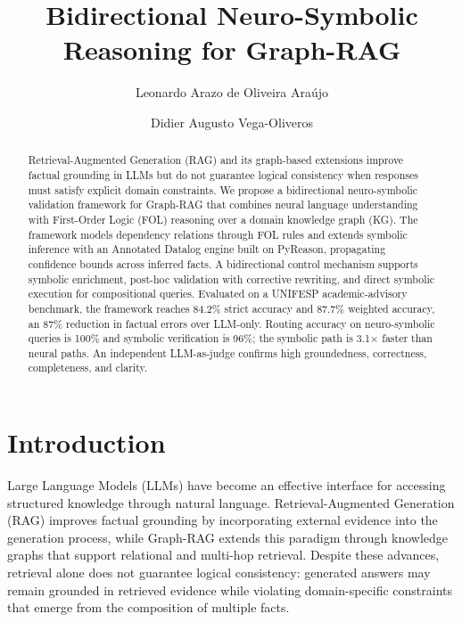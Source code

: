 \documentclass[runningheads]{llncs}
\begin{document}
%
\title{Bidirectional Neuro-Symbolic Reasoning for Graph-RAG}
%
\author{Leonardo Arazo de Oliveira Araújo \and
Didier Augusto Vega-Oliveros}
%
%
%
\maketitle
%
\begin{abstract}
Retrieval-Augmented Generation (RAG) and its graph-based extensions improve factual grounding in LLMs but do not guarantee logical consistency when responses must satisfy explicit domain constraints. We propose a bidirectional neuro-symbolic validation framework for Graph-RAG that combines neural language understanding with First-Order Logic (FOL) reasoning over a domain knowledge graph (KG). The framework models dependency relations through FOL rules and extends symbolic inference with an Annotated Datalog engine built on PyReason, propagating confidence bounds across inferred facts. A bidirectional control mechanism supports symbolic enrichment, post-hoc validation with corrective rewriting, and direct symbolic execution for compositional queries. Evaluated on a UNIFESP academic-advisory benchmark, the framework reaches 84.2\% strict accuracy and 87.7\% weighted accuracy, an 87\% reduction in factual errors over LLM-only. Routing accuracy on neuro-symbolic queries is 100\% and symbolic verification is 96\%; the symbolic path is 3.1$\times$ faster than neural paths. An independent LLM-as-judge confirms high groundedness, correctness, completeness, and clarity.
\end{abstract}


\section{Introduction}

Large Language Models (LLMs) have become an effective interface for accessing structured knowledge through natural language. Retrieval-Augmented Generation (RAG) improves factual grounding by incorporating external evidence into the generation process, while Graph-RAG extends this paradigm through knowledge graphs that support relational and multi-hop retrieval. Despite these advances, retrieval alone does not guarantee logical consistency: generated answers may remain grounded in retrieved evidence while violating domain-specific constraints that emerge from the composition of multiple facts.
\end{document}
